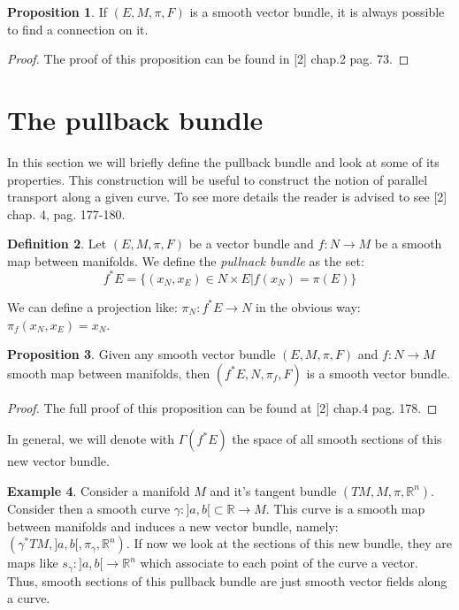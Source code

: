 \documentclass[12pt,a4paper]{report}
\theoremstyle{definition}
\newtheorem{Def}{Definition}[chapter]
\theoremstyle{Theorem}
\newtheorem{Prop}[Def]{Proposition}
\theoremstyle{definition}
\newtheorem{Ex}[Def]{Example}
\theoremstyle{definition}
\begin{document}
		\begin{Prop}
			If $(E,M,\pi,F)$ is a smooth vector bundle, it is always possible to find a connection on it.
		\end{Prop}
		\begin{proof}
			The proof of this proposition can be found in [2] chap.2 pag. 73.
		\end{proof}
	\section{The pullback bundle}
	In this section we will briefly define the pullback bundle and look at some of its properties. This construction will be useful to construct the notion of parallel transport along a given curve. To see more details the reader is advised to see [2] chap. 4, pag. 177-180.
	\begin{Def}
		Let $(E,M,\pi,F)$ be a vector bundle and $f:N\rightarrow M$ be a smooth map between manifolds. We define the \textit{pullnack bundle} as the set:
		$$f^*E=\{(x_N,x_E)\in N\times E|f(x_N)=\pi(E)\}$$
	\end{Def}
	We can define a projection like: $\pi_N:f^*E\rightarrow N$ in the obvious way: $\pi_f(x_N,x_E)=x_N$. 
	\begin{Prop}
		Given any smooth vector bundle $(E,M,\pi,F)$ and $f:N\rightarrow M$ smooth map between manifolds, then $(f^*E,N,\pi_f,F)$ is a smooth vector bundle.
	\end{Prop}
	\begin{proof}
		The full proof of this proposition can be found at [2] chap.4 pag. 178.
	\end{proof}
	In general, we will denote with $\Gamma(f^*E)$ the space of all smooth sections of this new vector bundle.
	\begin{Ex}
		Consider a manifold $M$ and it's tangent bundle $(TM,M,\pi,\mathbb{R}^n)$. Consider then a smooth curve $\gamma:]a,b[\subset \mathbb{R}\rightarrow M$. This curve is a smooth map between manifolds and induces a new vector bundle, namely: $(\gamma^*TM,]a,b[,\pi_\gamma,\mathbb{R}^n)$. If now we look at the sections of this new bundle, they are maps like $s_\gamma:]a,b[\rightarrow\mathbb{R}^n$ which associate to each point of the curve a vector. Thus, smooth sections of this pullback bundle are just smooth vector fields along a curve.
	\end{Ex}
\end{document}
